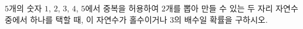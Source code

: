 $5$개의 숫자 $1$, $2$, $3$, $4$, $5$에서 중복을 허용하여 $2$개를 뽑아 만들 수 있는 두 자리 자연수 중에서 하나를 택할 때, 이 자연수가 홀수이거나 $3$의 배수일 확률을 구하시오.
